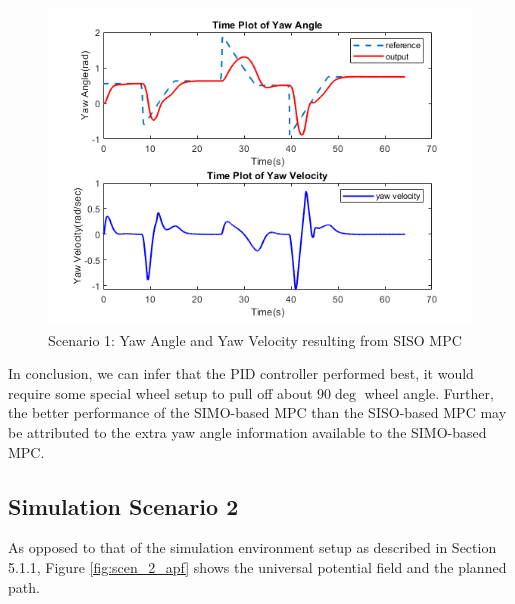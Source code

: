 \documentclass[a4paper, twocolumn]{article}
\begin{document}
\begin{figure}
    \centering
    \includegraphics[scale=0.40]{img/scenario_1/mpc1-yaw.png}
    \caption{Scenario 1: Yaw Angle and Yaw Velocity resulting from SISO MPC}
    \label{fig:scen_1_mpc1_yaw}
\end{figure}

In conclusion, we can infer that the PID controller performed best, 
it would require some special wheel setup to pull off about $90\deg$ wheel angle. 
Further, the better performance of the SIMO-based MPC than the SISO-based MPC may be attributed to the extra yaw angle information available to the SIMO-based MPC. 


\subsection{Simulation Scenario 2}
As opposed to that of the simulation environment setup as described in Section 5.1.1,  
Figure \ref{fig:scen_2_apf} shows the universal potential field and the planned path. 
\end{document}
